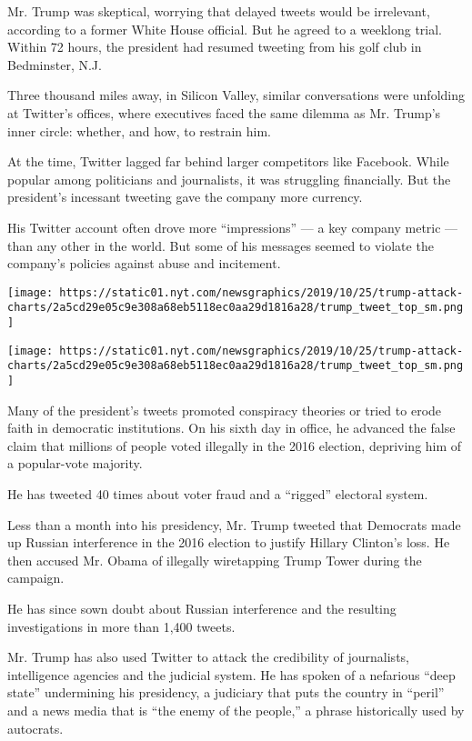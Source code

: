 Mr. Trump was skeptical, worrying that delayed tweets would be
irrelevant, according to a former White House official. But he agreed to
a weeklong trial. Within 72 hours, the president had resumed tweeting
from his golf club in Bedminster, N.J.

Three thousand miles away, in Silicon Valley, similar conversations were
unfolding at Twitter's offices, where executives faced the same dilemma
as Mr. Trump's inner circle: whether, and how, to restrain him.

At the time, Twitter lagged far behind larger competitors like Facebook.
While popular among politicians and journalists, it was struggling
financially. But the president's incessant tweeting gave the company
more currency.

His Twitter account often drove more ``impressions'' --- a key company
metric --- than any other in the world. But some of his messages seemed
to violate the company's policies against abuse and incitement.

\texttt{[image: https://static01.nyt.com/newsgraphics/2019/10/25/trump-attack-charts/2a5cd29e05c9e308a68eb5118ec0aa29d1816a28/trump\_tweet\_top\_sm.png]}

\texttt{[image: https://static01.nyt.com/newsgraphics/2019/10/25/trump-attack-charts/2a5cd29e05c9e308a68eb5118ec0aa29d1816a28/trump\_tweet\_top\_sm.png]}

Many of the president's tweets promoted conspiracy theories or tried to
erode faith in democratic institutions. On his sixth day in office, he
advanced the false claim that millions of people voted illegally in the
2016 election, depriving him of a popular-vote majority.

He has tweeted 40 times about voter fraud and a ``rigged'' electoral
system.

Less than a month into his presidency, Mr. Trump tweeted that Democrats
made up Russian interference in the 2016 election to justify Hillary
Clinton's loss. He then accused Mr. Obama of illegally wiretapping Trump
Tower during the campaign.

He has since sown doubt about Russian interference and the resulting
investigations in more than 1,400 tweets.

Mr. Trump has also used Twitter to attack the credibility of
journalists, intelligence agencies and the judicial system. He has
spoken of a nefarious ``deep state'' undermining his presidency, a
judiciary that puts the country in ``peril'' and a news media that is
``the enemy of the people,'' a phrase historically used by autocrats.


